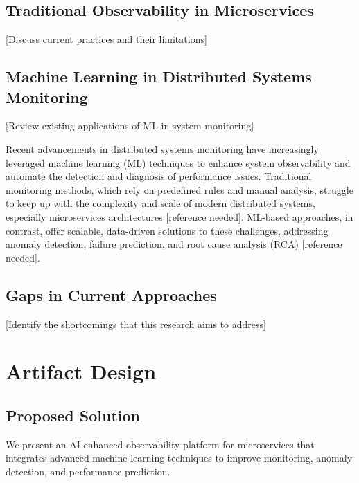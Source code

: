 \documentclass[10pt,journal,compsoc]{IEEEtran}
\begin{document}
\subsection{Traditional Observability in Microservices}
[Discuss current practices and their limitations]

\subsection{Machine Learning in Distributed Systems Monitoring}
[Review existing applications of ML in system monitoring]

Recent advancements in distributed systems monitoring have increasingly leveraged machine learning (ML) techniques to enhance system observability and automate the detection and diagnosis of performance issues. Traditional monitoring methods, which rely on predefined rules and manual analysis, struggle to keep up with the complexity and scale of modern distributed systems, especially microservices architectures [reference needed]. ML-based approaches, in contrast, offer scalable, data-driven solutions to these challenges, addressing anomaly detection, failure prediction, and root cause analysis (RCA) [reference needed].


\subsection{Gaps in Current Approaches}
[Identify the shortcomings that this research aims to address]

\section{Artifact Design}
\subsection{Proposed Solution}
We present an AI-enhanced observability platform for microservices that integrates advanced machine learning techniques to improve monitoring, anomaly detection, and performance prediction.
\end{document}
